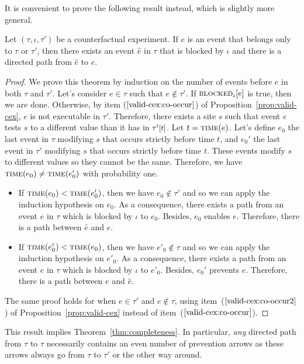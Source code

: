 It is convenient to prove the following result instead, which is
slightly more general.
\begin{theorem*} Let $(\tau, \iota, \tau')$ be a counterfactual
  experiment. If $e$ is an event that belongs only to $\tau$
  or $\tau'$, then there exists an event $\hat e$ in
  $\tau$ that is blocked by $\iota$ and there is a directed path 
  from $\hat e$ to $e$.
\end{theorem*}
\begin{proof}
  We prove this theorem by induction on the number of events before
  $e$ in both $\tau$ and $\tau'$. Let's consider $e \in \tau$ such
  that $e \notin \tau'$. If ${\textsc{blocked}}_{\iota}[e]$ is true, then we are
  done. Otherwise, by item ($\ref{valid-cex:co-occur}$) of
  Proposition~\ref{prop:valid-cex}, $e$ is not executable in
  $\tau'$. Therefore, there exists a site $s$ such that event $e$
  tests $s$ to a different value than it has in $\TSTATE{t}{\tau'}$.
  Let $t = \textsc{time}(e)$.  Let's define $e_0$ the last event in $\tau$
  modifying $s$ that occurs strictly before time $t$, and $e_0'$ the
  last event in $\tau'$ modifying $s$ that occurs strictly before time
  $t$. These events modify $s$ to different values so they cannot be
  the same. Therefore, we have $\textsc{time}(e_0) \neq \textsc{time}(e_0')$ with
  probability one.

  \begin{itemize}
  \item If $\textsc{time}(e_0) < \textsc{time}(e_0')$, then we have
    $e_0 \notin \tau'$ and so we can apply the induction hypothesis on
    $e_0$. As a consequence, there exists a path from an event
    $\hat e$ in $\tau$ which is blocked by $\iota$ to $e_0$. Besides,
    $e_0$ enables $e$. Therefore, there is a path between $\hat e$
    and $e$.
  \item If $\textsc{time}(e_0') < \textsc{time}(e_0)$, then we have
    $e'_0 \notin \tau$ and so we can apply the induction
    hypothesis on $e'_0$. As a consequence, there exists a path from
    an event $\hat e$ in $\tau$ which is blocked by $\iota$ to
    $e'_0$. Besides, $e_0'$ prevents $e$. Therefore, there is a path
    between $e$ and $\hat e$.
  \end{itemize}
  The same proof holds for when $e \in \tau'$ and $e \notin \tau$,
  using item~($\ref{valid-cex:co-occur2}$) of
  Proposition~\ref{prop:valid-cex} instead of
  item~($\ref{valid-cex:co-occur}$).
\end{proof}
This result implies Theorem~\ref{thm:completeness}. In particular,
\emph{any} directed path from $\tau$ to $\tau$ necessarily contains an
even number of prevention arrows as these arrows always go from
$\tau$ to $\tau'$ or the other way around.
